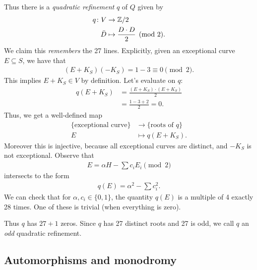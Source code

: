 \documentclass[11pt]{amsart}
\begin{document}
Thus there is a \textit{quadratic refinement} $q$ of $Q$ given by
\begin{align*}
    q \colon V &\to \mathbb{Z}/2 \\
    \bar{D} &\mapsto \frac{D\cdot D}{2} \pmod{2}.
\end{align*}
%
We claim this \textit{remembers} the 27 lines. Explicitly, given an exceptional curve $E \subseteq S$, we have that
\begin{align*}
    (E + K_S)(-K_S) = 1 - 3 \equiv 0 \pmod{2}.
\end{align*}
This implies $E + K_S\in V$ by definition. Let's evaluate on $q$:
\begin{align*}
    q(E + K_S) &= \frac{(E + K_S)\cdot (E + K_S)}{2} \\
    &= \frac{1 - 3 + 2}{2} = 0.
\end{align*}
Thus, we get a well-defined map
\begin{align*}
\{\text{exceptional curve}\} &\to \{\text{roots of }q\} \\
    E &\mapsto q(E+K_S).
\end{align*}
Moreover this is injective, because all exceptional curves are distinct, and $-K_S$ is not exceptional. Observe that
\begin{align*}
    E = \alpha H - \sum c_i E_i \pmod{2}
\end{align*}
intersects to the form
\begin{align*}
    q(E) = \alpha^2 - \sum c_i^2.
\end{align*}
We can check that for $\alpha,c_i \in \{0,1\}$, the quantity $q(E)$ is a multiple of 4 exactly 28 times. One of these is trivial (when everything is zero).

Thus $q$ has $27+1$ zeros. Since $q$ has 27 distinct roots and 27 is odd, we call $q$ an \textit{odd} quadratic refinement.

\subsection{Automorphisms and monodromy}
\end{document}
